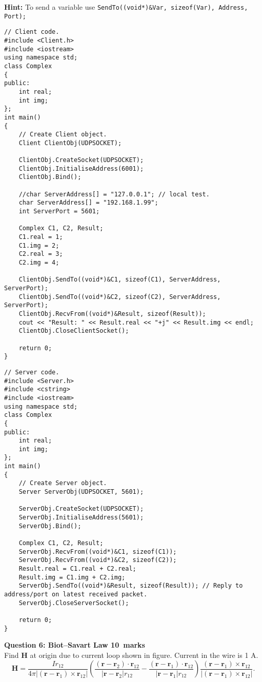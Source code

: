 \documentclass[12pt,a4paper]{article}
\def\Qsix{10}
\begin{document}
\textbf{Hint:} To send a variable use \verb|SendTo((void*)&Var, sizeof(Var), Address, Port);|
\begin{lstlisting}
// Client code.
#include <Client.h>
#include <iostream>
using namespace std;
class Complex
{
public:
	int real;
	int img;
};
int main()
{
	// Create Client object.
	Client ClientObj(UDPSOCKET);

	ClientObj.CreateSocket(UDPSOCKET);
	ClientObj.InitialiseAddress(6001);
	ClientObj.Bind();

	//char ServerAddress[] = "127.0.0.1"; // local test.
	char ServerAddress[] = "192.168.1.99";
	int ServerPort = 5601;

	Complex C1, C2, Result;
	C1.real = 1;
	C1.img = 2;
	C2.real = 3;
	C2.img = 4;

	ClientObj.SendTo((void*)&C1, sizeof(C1), ServerAddress, ServerPort);
	ClientObj.SendTo((void*)&C2, sizeof(C2), ServerAddress, ServerPort);
	ClientObj.RecvFrom((void*)&Result, sizeof(Result));
	cout << "Result: " << Result.real << "+j" << Result.img << endl;
	ClientObj.CloseClientSocket();

	return 0;
}
\end{lstlisting}
\begin{lstlisting}
// Server code.
#include <Server.h>
#include <cstring>
#include <iostream>
using namespace std;
class Complex
{
public:
	int real;
	int img;
};
int main()
{
	// Create Server object.
	Server ServerObj(UDPSOCKET, 5601);

	ServerObj.CreateSocket(UDPSOCKET);
	ServerObj.InitialiseAddress(5601);
	ServerObj.Bind();

	Complex C1, C2, Result;
	ServerObj.RecvFrom((void*)&C1, sizeof(C1));
	ServerObj.RecvFrom((void*)&C2, sizeof(C2));
	Result.real = C1.real + C2.real;
	Result.img = C1.img + C2.img;
	ServerObj.SendTo((void*)&Result, sizeof(Result)); // Reply to address/port on latest received packet.
	ServerObj.CloseServerSocket();

	return 0;
}
\end{lstlisting}
\newpage
\noindent\textbf{Question 6: Biot--Savart Law \hfill \Qsix~marks}\\
Find \textbf{H} at origin due to current loop shown in figure. Current in the wire is 1 A.
\begin{equation*}
\textbf{H}=\dfrac{Ir_{12}}{4\pi|(\textbf{r}-\textbf{r}_1)\times\textbf{r}_{12}|}\left(\dfrac{(\textbf{r}-\textbf{r}_2)\cdot\textbf{r}_{12}}{|\textbf{r}-\textbf{r}_2|r_{12}}-\dfrac{(\textbf{r}-\textbf{r}_1)\cdot\textbf{r}_{12}}{|\textbf{r}-\textbf{r}_1|r_{12}}\right)\dfrac{(\textbf{r}-\textbf{r}_1)\times\textbf{r}_{12}}{|(\textbf{r}-\textbf{r}_1)\times \textbf{r}_{12}|}.
\end{equation*}
\end{document}
